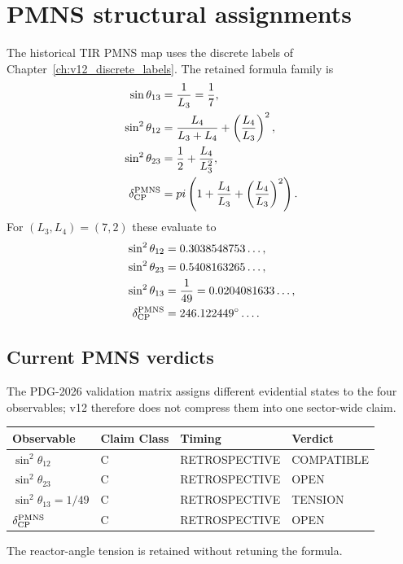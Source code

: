 \documentclass[11pt,a4paper,twoside]{book}
\def\pi{pi}%
\theoremstyle{definition}
\begin{document}
\section{PMNS structural assignments}
The historical TIR PMNS map uses the discrete labels of
Chapter~\ref{ch:v12_discrete_labels}.  The retained formula family is
\begin{align}
\sin\theta_{13}
&=\frac1{L_3}=\frac17,
\label{eq:v12-pmns-theta13}\\
\sin^2\theta_{12}
&=\frac{L_4}{L_3+L_4}
+\left(\frac{L_4}{L_3}\right)^2,
\label{eq:v12-pmns-theta12}\\
\sin^2\theta_{23}
&=\frac12+\frac{L_4}{L_3^2},
\label{eq:v12-pmns-theta23}\\
\delta_{\rm CP}^{\rm PMNS}
&=\pi\left(
1+\frac{L_4}{L_3}
+\left(\frac{L_4}{L_3}\right)^2
\right).
\label{eq:v12-pmns-delta}
\end{align}
For $(L_3,L_4)=(7,2)$ these evaluate to
\begin{align}
\sin^2\theta_{12}&=0.3038548753\ldots,\\
\sin^2\theta_{23}&=0.5408163265\ldots,\\
\sin^2\theta_{13}&=\frac1{49}=0.0204081633\ldots,\\
\delta_{\rm CP}^{\rm PMNS}&=246.122449^\circ\ldots .
\end{align}

\subsection{Current PMNS verdicts}
The PDG-2026 validation matrix assigns different evidential states to the four
observables; v12 therefore does not compress them into one sector-wide claim.

{\setlength{\tabcolsep}{3pt}
\begin{longtable}{p{}p{}p{}p{}}
\toprule
Observable & Claim Class & Timing & Verdict\\
\midrule
$\sin^2\theta_{12}$ & C & RETROSPECTIVE & COMPATIBLE\\
$\sin^2\theta_{23}$ & C & RETROSPECTIVE & OPEN\\
$\sin^2\theta_{13}=1/49$ & C & RETROSPECTIVE & TENSION\\
$\delta_{\rm CP}^{\rm PMNS}$ & C & RETROSPECTIVE & OPEN\\
\bottomrule
\end{longtable}}
The reactor-angle tension is retained without retuning the formula.
\end{document}
